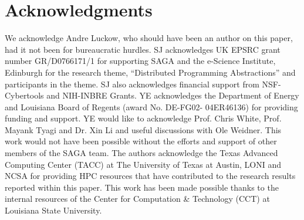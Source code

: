 \documentclass{sig-alternate}
\begin{document}




\section{Acknowledgments}
We acknowledge Andre Luckow, who should have been an author on this
paper, had it not been for bureaucratic hurdles.  SJ acknowledges UK
EPSRC grant number GR/D0766171/1 for supporting SAGA and the e-Science
Institute, Edinburgh for the research theme, ``Distributed Programming
Abstractions'' and participants in the theme. SJ also acknowledges
financial support from NSF-Cybertools and NIH-INBRE Grants. YE
acknowledges the Department of Energy and Louisiana Board of Regents
(award No. DE-FG02- 04ER46136) for providing funding and support. YE
would like to acknowledge Prof. Chris White, Prof. Mayank Tyagi and
Dr. Xin Li and useful discussions with Ole Weidner. This work would
not have been possible without the efforts and support of other
members of the SAGA team. The authors acknowledge the Texas Advanced
Computing Center (TACC) at The University of Texas at Austin, LONI and
NCSA for providing HPC resources that have contributed to the research
results reported within this paper. This work has been made possible
thanks to the internal resources of the Center for Computation \&
Technology (CCT) at Louisiana State University.

 

\end{document}

